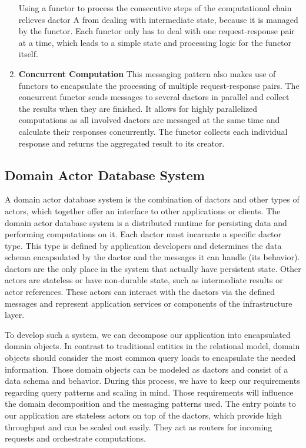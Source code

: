 \begin{enumerate}
        Using a \gls{functor} to process the consecutive steps of the computational chain relieves \gls{dactor} A from dealing with intermediate state, because it is managed by the \gls{functor}.
        Each \gls{functor} only has to deal with one request-response pair at a time, which leads to a simple state and processing logic for the \gls{functor} itself.

      \item\label{enum:comp_pattern_3} \textbf{Concurrent Computation}
        This messaging pattern also makes use of \glspl{functor} to encapsulate the processing of multiple request-response pairs.
        The concurrent \gls{functor} sends messages to several \glspl{dactor} in parallel and collect the results when they are finished.
        It allows for highly parallelized computations as all involved \glspl{dactor} are messaged at the same time and calculate their responses concurrently.
        The \gls{functor} collects each individual response and returns the aggregated result to its creator.
    \end{enumerate}


  \subsection{Domain Actor Database System}\label{sec:domain_actor_database}
    A domain actor database system is the combination of \glspl{dactor} and other types of actors, which together offer an interface to other applications or clients.
    The domain actor database system is a distributed runtime for persisting data and performing computations on it.
    Each \gls{dactor} must incarnate a specific \gls{dactor} type.
    This type is defined by application developers and determines the data schema encapsulated by the \gls{dactor} and the messages it can handle (its behavior).
    \Glspl{dactor} are the only place in the system that actually have persistent state.
    Other actors are stateless or have non-durable state, such as intermediate results or actor references.
    These actors can interact with the \glspl{dactor} via the defined messages and represent application services or components of the infrastructure layer.
    
    To develop such a system, we can decompose our application into encapsulated domain objects.
    In contrast to traditional entities in the relational model, domain objects should consider the most common query loads to encapsulate the needed information.
    Those domain objects can be modeled as \glspl{dactor} and consist of a data schema and behavior.
    During this process, we have to keep our requirements regarding query patterns and scaling in mind.
    Those requirements will influence the domain decomposition and the messaging patterns used.
    The entry points to our application are stateless actors on top of the \glspl{dactor}, which provide high throughput and can be scaled out easily.
    They act as routers for incoming requests and orchestrate computations.
